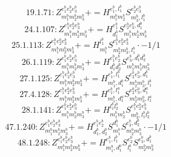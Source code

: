 \documentclass[letterpaper,10pt,fleqn,leqno,onecolumn]{article}
\begin{document}
\begin{equation} \;\;\;\;\;\;  19.1.71: Z^{e_{1}^{b}e_{2}^{b}e_{3}^{b}}_{m_{1}^{b}m_{2}^{b}m_{3}^{b}}+=H^{e_{1}^{b},l_{1}^{b}}_{m_{1}^{b}m_{2}^{b}}S^{e_{2}^{b}e_{3}^{b}}_{m_{3}^{b},l_{1}^{b}} \end{equation}
\begin{equation} \;\;\;\;\;\;  24.1.107: Z^{e_{1}^{b}e_{2}^{b}e_{3}^{b}}_{m_{1}^{b}m_{2}^{b}m_{3}^{b}}+=H^{e_{1}^{b}}_{d_{1}^{b}}S^{e_{2}^{b}e_{3}^{b},d_{1}^{b}}_{m_{1}^{b}m_{2}^{b}m_{3}^{b}} \end{equation}
\begin{equation} \;\;\;\;\;\;  25.1.113: Z^{e_{1}^{b}e_{2}^{b}e_{3}^{b}}_{m_{1}^{b}m_{2}^{b}m_{3}^{b}}+=H^{l_{1}^{b}}_{m_{1}^{b}}S^{e_{1}^{b}e_{2}^{b}e_{3}^{b}}_{m_{2}^{b}m_{3}^{b},l_{1}^{b}}\cdot -1/1 \end{equation}
\begin{equation} \;\;\;\;\;\;  26.1.119: Z^{e_{1}^{b}e_{2}^{b}e_{3}^{b}}_{m_{1}^{b}m_{2}^{b}m_{3}^{b}}+=H^{e_{1}^{b}e_{2}^{b}}_{d_{1}^{b}d_{2}^{b}}S^{e_{3}^{b},d_{1}^{b}d_{2}^{b}}_{m_{1}^{b}m_{2}^{b}m_{3}^{b}} \end{equation}
\begin{equation} \;\;\;\;\;\;  27.1.125: Z^{e_{1}^{b}e_{2}^{b}e_{3}^{b}}_{m_{1}^{b}m_{2}^{b}m_{3}^{b}}+=H^{e_{1}^{b},l_{1}^{b}}_{m_{1}^{b},d_{1}^{b}}S^{e_{2}^{b}e_{3}^{b},d_{1}^{b}}_{m_{2}^{b}m_{3}^{b},l_{1}^{b}} \end{equation}
\begin{equation} \;\;\;\;\;\;  27.4.128: Z^{e_{1}^{b}e_{2}^{b}e_{3}^{b}}_{m_{1}^{b}m_{2}^{b}m_{3}^{b}}+=H^{e_{1}^{b},l_{1}^{a}}_{m_{1}^{b},d_{1}^{a}}S^{e_{2}^{b}e_{3}^{b},d_{1}^{a}}_{m_{2}^{b}m_{3}^{b},l_{1}^{a}} \end{equation}
\begin{equation} \;\;\;\;\;\;  28.1.141: Z^{e_{1}^{b}e_{2}^{b}e_{3}^{b}}_{m_{1}^{b}m_{2}^{b}m_{3}^{b}}+=H^{l_{1}^{b}l_{2}^{b}}_{m_{1}^{b}m_{2}^{b}}S^{e_{1}^{b}e_{2}^{b}e_{3}^{b}}_{m_{3}^{b},l_{1}^{b}l_{2}^{b}} \end{equation}
\begin{equation} \;\;\;\;\;\;  47.1.240: Z^{e_{1}^{b}e_{2}^{b}e_{3}^{b}}_{m_{1}^{b}m_{2}^{b}m_{3}^{b}}+=H^{e_{1}^{b}e_{2}^{b}}_{d_{1}^{b},d_{2}^{b}}S^{d_{1}^{b}}_{m_{1}^{b}}S^{e_{3}^{b},d_{2}^{b}}_{m_{2}^{b}m_{3}^{b}}\cdot -1/1 \end{equation}
\begin{equation} \;\;\;\;\;\;  48.1.248: Z^{e_{1}^{b}e_{2}^{b}e_{3}^{b}}_{m_{1}^{b}m_{2}^{b}m_{3}^{b}}+=H^{e_{1}^{b},l_{1}^{b}}_{m_{1}^{b},d_{1}^{b}}S^{e_{2}^{b}}_{l_{1}^{b}}S^{e_{3}^{b},d_{1}^{b}}_{m_{2}^{b}m_{3}^{b}} \end{equation}
\end{document}
